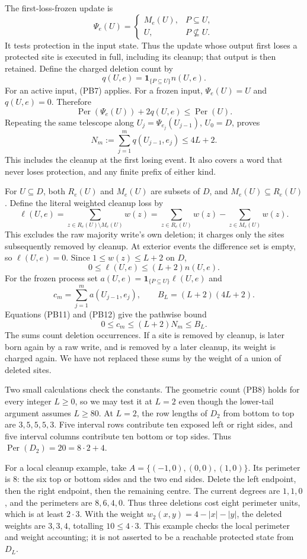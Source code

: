 \documentclass[
  11pt,
  a4paper,
]{article}
\begin{document}
The first-loss-frozen update is \[
\Psi_e(U)=
\begin{cases}
M_e(U),&P\subseteq U,\\
U,&P\not\subseteq U.
\end{cases}
\tag{PB10}
\] It tests protection in the input state. Thus the update whose output
first loses a protected site is executed in full, including its cleanup;
that output is then retained. Define the charged deletion count by \[
q(U,e)=\mathbf1_{\{P\subseteq U\}}n(U,e).
\] For an active input, (PB7) applies. For a frozen input,
\(\Psi_e(U)=U\) and \(q(U,e)=0\). Therefore \[
\operatorname{Per}(\Psi_e(U))+2q(U,e)\leq\operatorname{Per}(U).
\] Repeating the same telescope along \(U_j=\Psi_{e_j}(U_{j-1})\),
\(U_0=D\), proves \[
N_m:=\sum_{j=1}^m q(U_{j-1},e_j)\leq4L+2.
\tag{PB11}
\] This includes the cleanup at the first losing event. It also covers a
word that never loses protection, and any finite prefix of either kind.

For \(U\subseteq D\), both \(R_e(U)\) and \(M_e(U)\) are subsets of
\(D\), and \(M_e(U)\subseteq R_e(U)\). Define the literal weighted
cleanup loss by \[
\ell(U,e)
=\sum_{z\in R_e(U)\setminus M_e(U)}w(z)
=\sum_{z\in R_e(U)}w(z)-\sum_{z\in M_e(U)}w(z).
\tag{PB12}
\] This excludes the raw majority write's own deletion; it charges only
the sites subsequently removed by cleanup. At exterior events the
difference set is empty, so \(\ell(U,e)=0\). Since
\(1\leq w(z)\leq L+2\) on \(D\), \[
0\leq \ell(U,e)\leq(L+2)n(U,e).
\] For the frozen process set
\(a(U,e)=\mathbf1_{\{P\subseteq U\}}\ell(U,e)\) and \[
c_m=\sum_{j=1}^m a(U_{j-1},e_j),\qquad B_L=(L+2)(4L+2).
\] Equations (PB11) and (PB12) give the pathwise bound \[
0\leq c_m\leq(L+2)N_m\leq B_L.
\tag{PB13}
\] The sums count deletion occurrences. If a site is removed by cleanup,
is later born again by a raw write, and is removed by a later cleanup,
its weight is charged again. We have not replaced these sums by the
weight of a union of deleted sites.

Two small calculations check the constants. The geometric count (PB8)
holds for every integer \(L\geq0\), so we may test it at \(L=2\) even
though the lower-tail argument assumes \(L\geq80\). At \(L=2\), the row
lengths of \(D_2\) from bottom to top are \(3,5,5,5,3\). Five interval
rows contribute ten exposed left or right sides, and five interval
columns contribute ten bottom or top sides. Thus
\(\operatorname{Per}(D_2)=20=8\cdot2+4\).

For a local cleanup example, take \(A=\{(-1,0),(0,0),(1,0)\}\). Its
perimeter is \(8\): the six top or bottom sides and the two end sides.
Delete the left endpoint, then the right endpoint, then the remaining
centre. The current degrees are \(1,1,0\), and the perimeters are
\(8,6,4,0\). Thus three deletions cost eight perimeter units, which is
at least \(2\cdot3\). With the weight \(w_2(x,y)=4-|x|-|y|\), the
deleted weights are \(3,3,4\), totalling \(10\leq4\cdot3\). This example
checks the local perimeter and weight accounting; it is not asserted to
be a reachable protected state from \(D_L\).
\end{document}
